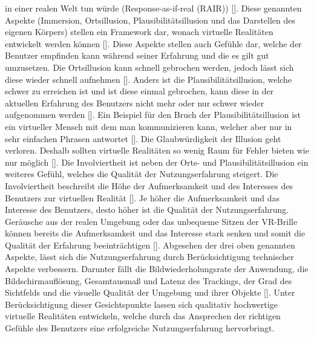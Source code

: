 \documentclass[a4paper,12pt,oneside]{article}
\begin{document}
        in einer realen Welt tun würde (\glqq Response-as-if-real\grqq{} (RAIR)) 
        [\cite{Slater2009}]. Diese genannten Aspekte (Immersion, Ortsillusion, 
        Plausibilitätsillusion und das Darstellen des eigenen Körpers) stellen ein 
        Framework dar, wonach virtuelle Realitäten entwickelt werden können 
        [\cite{Slater2009}]. Diese Aspekte stellen auch Gefühle dar, welche der Benutzer
        empfinden kann während seiner Erfahrung und die es gilt gut umzusetzen. Die 
        Ortsillusion kann schnell gebrochen werden, jedoch lässt sich diese wieder schnell
        aufnehmen [\cite{Slater2009}]. Anders ist die Plausibilitätsillusion, welche schwer
        zu erreichen ist und ist diese einmal gebrochen, kann diese in der aktuellen 
        Erfahrung des Benutzers nicht mehr oder nur schwer wieder aufgenommen werden 
        [\cite{Slater2009}].
        Ein Beispiel für den Bruch der Plausibilitätsillusion ist ein virtueller Mensch mit
        dem man kommunizieren kann, welcher aber nur in sehr einfachen Phrasen antwortet
        [\cite[19]{Dorner2013}]. Die Glaubwürdigkeit der Illusion geht verloren. Deshalb 
        sollten virtuelle Realitäten so wenig Raum für Fehler bieten wie nur 
        möglich [\cite{Slater2009}].
        Die Involviertheit ist neben der Orts- und Plausibilitätsillusion ein weiteres
        Gefühl, welches die Qualität der Nutzungserfahrung steigert. Die Involviertheit
        beschreibt die Höhe der Aufmerksamkeit und des Interesses des Benutzers zur
        virtuellen Realität [\cite[227]{Witmer1998}]. Je höher die Aufmerksamkeit und das
        Interesse des Benutzers, desto höher ist die Qualität der Nutzungserfahrung.
        Geräusche aus der realen Umgebung oder das unbequeme Sitzen der VR-Brille können
        bereits die Aufmerksamkeit und das Interesse stark senken und somit die Qualität
        der Erfahrung beeinträchtigen [\cite[227]{Witmer1998}].
        Abgesehen der drei oben genannten Aspekte, lässt sich die Nutzungserfahrung durch
        Berücksichtigung technischer Aspekte verbessern. Darunter fällt die
        Bildwiederholungsrate der Anwendung, die Bildschirmauflösung, Gesamtausmaß und
        Latenz des Trackings, der Grad des Sichtfelds und die visuelle Qualität der Umgebung
        und ihrer Objekte [\cite{Slater2009}].
        Unter Berücksichtigung dieser Gesichtspunkte lassen sich qualitativ hochwertige
        virtuelle Realitäten entwickeln, welche durch das Ansprechen der richtigen Gefühle
        des Benutzers eine erfolgreiche Nutzungserfahrung hervorbringt.
\end{document}
